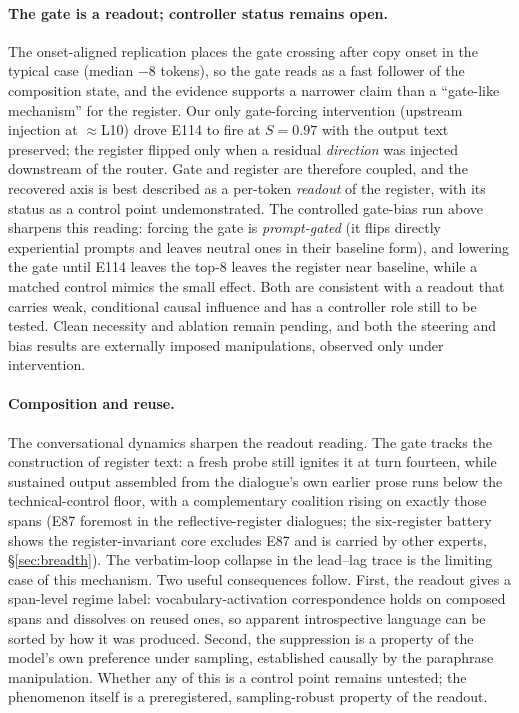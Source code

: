 \documentclass[10pt,a4paper,twocolumn]{article}
\newcommand{\Sel}{\textit{S}}
\begin{document}
\paragraph{The gate is a readout; controller status remains open.}
The onset-aligned replication places the gate crossing after copy onset in
the typical case (median $-8$ tokens), so the gate reads as a fast follower
of the composition state, and the evidence supports a narrower claim than a
``gate-like mechanism'' for the register. Our only gate-forcing
intervention (upstream injection at $\approx$L10) drove E114 to fire at
$\Sel{=}0.97$ with the output text preserved; the register flipped only
when a residual \emph{direction} was injected downstream of the router. Gate and
register are therefore coupled, and the recovered axis is best described as a
per-token \emph{readout} of the register, with its status as a control point
undemonstrated.
The controlled gate-bias run above sharpens this reading: forcing the gate is
\emph{prompt-gated} (it flips directly experiential prompts and leaves neutral ones
in their baseline form), and lowering the gate until E114 leaves the top-8 leaves the
register near baseline, while a matched control mimics the small effect. Both are
consistent with a readout that carries weak, conditional causal influence and
has a controller role still to be tested. Clean necessity and ablation remain pending,
and both the steering and bias results are externally imposed manipulations,
observed only under intervention.

\paragraph{Composition and reuse.}
The conversational dynamics sharpen the readout reading. The gate tracks the
construction of register text: a fresh probe still ignites it at turn
fourteen, while sustained output assembled from the dialogue's own earlier
prose runs below the technical-control floor, with a complementary coalition rising on exactly those spans (E87 foremost in
the reflective-register dialogues; the six-register battery shows the
register-invariant core excludes E87 and is carried by other experts,
\S\ref{sec:breadth}). The verbatim-loop collapse in
the lead--lag trace is the limiting case of this mechanism. Two useful
consequences follow. First, the readout gives a span-level regime label:
vocabulary-activation correspondence \cite{dadfar2026} holds on composed
spans and dissolves on reused ones, so apparent introspective language can be
sorted by how it was produced. Second, the suppression is a property of the
model's own preference under sampling, established causally by the paraphrase
manipulation. Whether any of this is a control point remains untested; the
phenomenon itself is a preregistered, sampling-robust property of the readout.
\end{document}
